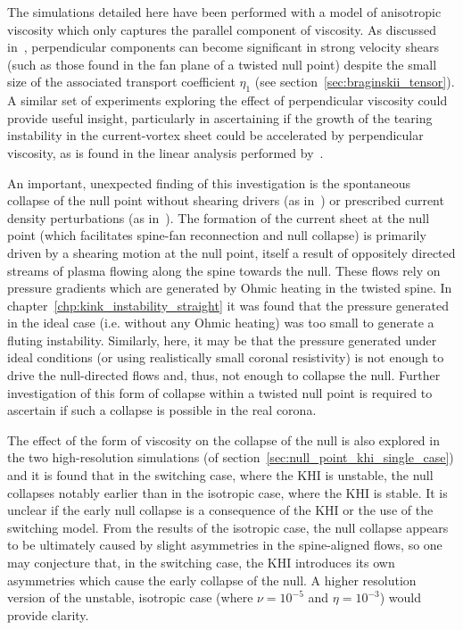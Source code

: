 The simulations detailed here have been performed with a model of anisotropic viscosity which only captures the parallel component of viscosity. As discussed in~\cite{einaudiResistiveInstabilitiesFlowing1989}, perpendicular components can become significant in strong velocity shears (such as those found in the fan plane of a twisted null point) despite the small size of the associated transport coefficient $\eta_1$ (see section~\ref{sec:braginskii_tensor}). A similar set of experiments exploring the effect of perpendicular viscosity could provide useful insight, particularly in ascertaining if the growth of the tearing instability in the current-vortex sheet could be accelerated by perpendicular viscosity, as is found in the linear analysis performed by~\cite{einaudiResistiveInstabilitiesFlowing1989}.

An important, unexpected finding of this investigation is the spontaneous collapse of the null point without shearing drivers (as in~\cite{pontinCurrentSheetFormation2007}) or prescribed current density perturbations (as in~\cite{thurgoodImplosiveCollapseMagnetic2018}). The formation of the current sheet at the null point (which facilitates spine-fan reconnection and null collapse) is primarily driven by a shearing motion at the null point, itself a result of oppositely directed streams of plasma flowing along the spine towards the null. These flows rely on pressure gradients which are generated by Ohmic heating in the twisted spine. In chapter~\ref{chp:kink_instability_straight} it was found that the pressure generated in the ideal case (i.e. without any Ohmic heating) was too small to generate a fluting instability. Similarly, here, it may be that the pressure generated under ideal conditions (or using realistically small coronal resistivity) is not enough to drive the null-directed flows and, thus, not enough to collapse the null. Further investigation of this form of collapse within a twisted null point is required to ascertain if such a collapse is possible in the real corona.

The effect of the form of viscosity on the collapse of the null is also explored in the two high-resolution simulations (of section~\ref{sec:null_point_khi_single_case}) and it is found that in the switching case, where the KHI is unstable, the null collapses notably earlier than in the isotropic case, where the KHI is stable. It is unclear if the early null collapse is a consequence of the KHI or the use of the switching model. From the results of the isotropic case, the null collapse appears to be ultimately caused by slight asymmetries in the spine-aligned flows, so one may conjecture that, in the switching case, the KHI introduces its own asymmetries which cause the early collapse of the null. A higher resolution version of the unstable, isotropic case (where $\nu = 10^{-5}$ and $\eta=10^{-3}$) would provide clarity.

